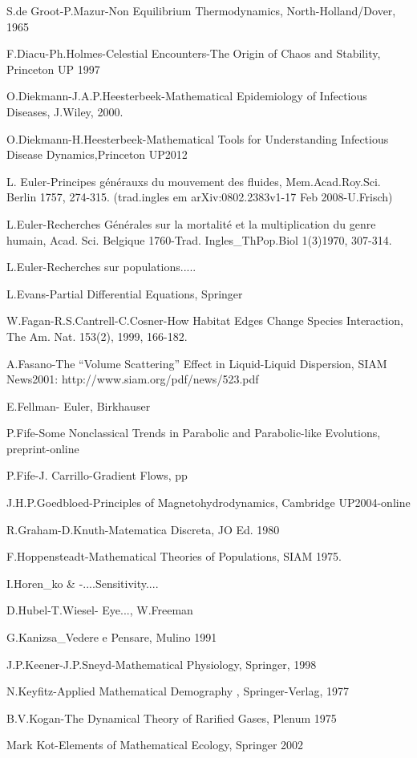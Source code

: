 S.de Groot-P.Mazur-Non Equilibrium Thermodynamics, North-Holland/Dover, 1965

F.Diacu-Ph.Holmes-Celestial Encounters-The Origin of Chaos and Stability, Princeton UP 1997

O.Diekmann-J.A.P.Heesterbeek-Mathematical Epidemiology of Infectious Diseases, J.Wiley, 2000.

O.Diekmann-H.Heesterbeek-Mathematical Tools for Understanding Infectious Disease Dynamics,Princeton UP2012

L. Euler-Principes générauxs du mouvement des fluides, Mem.Acad.Roy.Sci. Berlin 1757, 274-315. (trad.ingles em arXiv:0802.2383v1-17 Feb 2008-U.Frisch)

L.Euler-Recherches Générales sur la mortalité et la multiplication du genre humain, Acad. Sci. Belgique 1760-Trad. Ingles\_ThPop.Biol 1(3)1970, 307-314.

L.Euler-Recherches sur populations.....

L.Evans-Partial Differential Equations, Springer

W.Fagan-R.S.Cantrell-C.Cosner-How Habitat Edges Change Species Interaction, The Am. Nat. 153(2), 1999, 166-182.

A.Fasano-The ``Volume Scattering'' Effect in Liquid-Liquid Dispersion, SIAM News2001: http://www.siam.org/pdf/news/523.pdf

E.Fellman- Euler, Birkhauser

P.Fife-Some Nonclassical Trends in Parabolic and Parabolic-like Evolutions, preprint-online

P.Fife-J. Carrillo-Gradient Flows, pp

J.H.P.Goedbloed-Principles of Magnetohydrodynamics, Cambridge UP2004-online

R.Graham-D.Knuth-Matematica Discreta, JO Ed. 1980

F.Hoppensteadt-Mathematical Theories of Populations, SIAM 1975.

I.Horen\_ko \& -....Sensitivity....

D.Hubel-T.Wiesel- Eye..., W.Freeman

G.Kanizsa\_Vedere e Pensare, Mulino 1991

J.P.Keener-J.P.Sneyd-Mathematical Physiology, Springer, 1998

N.Keyfitz-Applied Mathematical Demography , Springer-Verlag, 1977

B.V.Kogan-The Dynamical Theory of Rarified Gases, Plenum 1975

Mark Kot-Elements of Mathematical Ecology, Springer 2002

